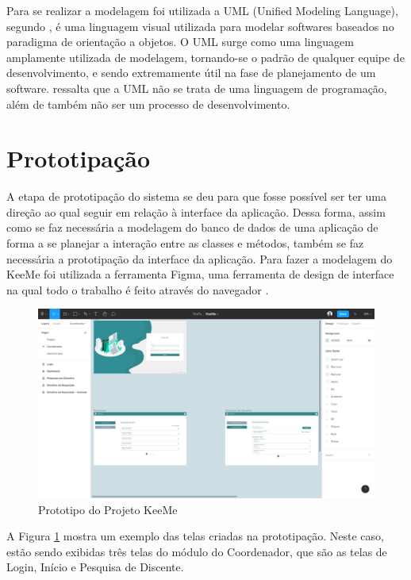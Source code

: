Para se realizar a modelagem foi utilizada a UML (Unified Modeling Language), segundo \cite{guedes2018uml}, é uma linguagem visual utilizada para modelar softwares baseados no paradigma de orientação a objetos. O UML surge como uma linguagem amplamente utilizada de modelagem, tornando-se o padrão de qualquer equipe de desenvolvimento, e sendo extremamente útil na fase de planejamento de um software. \cite{guedes2018uml} ressalta que a UML não se trata de uma linguagem de programação, além de também não ser um processo de desenvolvimento.

\section{Prototipação}
\label{sec:prototipacao}

A etapa de prototipação do sistema se deu para que fosse possível ser ter uma direção ao qual seguir em relação à interface da aplicação. Dessa forma, assim como se faz necessária a modelagem do banco de dados de uma aplicação de forma a se planejar a interação entre as classes e métodos, também se faz necessária a prototipação da interface da aplicação. Para fazer a modelagem do KeeMe foi utilizada a ferramenta Figma, uma ferramenta de design de interface na qual todo o trabalho é feito através do navegador \cite{interativa2019figma}.

\begin{figure}[H]
    \centering
    \includegraphics[width=\textwidth]{dados/figuras/Metodologia/figma.png}
    \caption{Prototipo do Projeto KeeMe}
    \label{fig:figmaKeeMe}
\end{figure}

A Figura \ref{fig:figmaKeeMe} mostra um exemplo das telas criadas na prototipação. Neste caso, estão sendo exibidas três telas do módulo do Coordenador, que são as telas de Login, Início e Pesquisa de Discente. 


